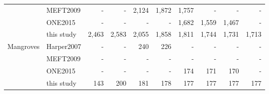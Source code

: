 \documentclass[a4paper, 12pt, leqno]{article}\usepackage[]{graphicx}\usepackage[]{color}
\begin{document}
\begin{table}[!h]
\begin{tabular}[t]{llrrrrrrrr}
 & MEFT2009 & - & - & 2,124 & 1,872 & 1,757 & - & - & -\\
 & ONE2015 & - & - & - & - & 1,682 & 1,559 & 1,467 & -\\
 & this study & 2,463 & 2,583 & 2,055 & 1,858 & 1,811 & 1,744 & 1,731 & 1,713\\
Mangroves & Harper2007 & - & - & 240 & 226 & - & - & - & -\\
 & MEFT2009 & - & - & - & - & - & - & - & -\\
 & ONE2015 & - & - & - & - & 174 & 171 & 170 & -\\
 & this study & 143 & 200 & 181 & 178 & 177 & 177 & 177 & 177\\
\bottomrule
\end{tabular}
\end{table}



\newpage
\end{document}
